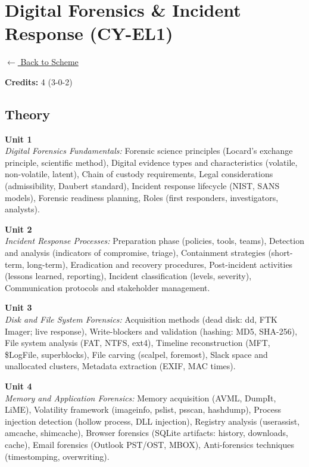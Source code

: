 \section*{Digital Forensics \& Incident Response (CY-EL1)}
\label{elec:CY_1}

\noindent \small{\hyperref[main:scheme]{$\leftarrow$ Back to Scheme}} \vspace{0.5cm}

\noindent \textbf{Credits:} 4 (3-0-2)

\subsection*{Theory}
\noindent\textbf{Unit 1} \\
\textit{Digital Forensics Fundamentals:} Forensic science principles (Locard's exchange principle, scientific method), Digital evidence types and characteristics (volatile, non-volatile, latent), Chain of custody requirements, Legal considerations (admissibility, Daubert standard), Incident response lifecycle (NIST, SANS models), Forensic readiness planning, Roles (first responders, investigators, analysts).

\vspace{0.3cm}

\noindent\textbf{Unit 2} \\
\textit{Incident Response Processes:} Preparation phase (policies, tools, teams), Detection and analysis (indicators of compromise, triage), Containment strategies (short-term, long-term), Eradication and recovery procedures, Post-incident activities (lessons learned, reporting), Incident classification (levels, severity), Communication protocols and stakeholder management.

\vspace{0.3cm}

\noindent\textbf{Unit 3} \\
\textit{Disk and File System Forensics:} Acquisition methods (dead disk: dd, FTK Imager; live response), Write-blockers and validation (hashing: MD5, SHA-256), File system analysis (FAT, NTFS, ext4), Timeline reconstruction (MFT, \$LogFile, superblocks), File carving (scalpel, foremost), Slack space and unallocated clusters, Metadata extraction (EXIF, MAC times).

\vspace{0.3cm}

\noindent\textbf{Unit 4} \\
\textit{Memory and Application Forensics:} Memory acquisition (AVML, DumpIt, LiME), Volatility framework (imageinfo, pslist, psscan, hashdump), Process injection detection (hollow process, DLL injection), Registry analysis (userassist, amcache, shimcache), Browser forensics (SQLite artifacts: history, downloads, cache), Email forensics (Outlook PST/OST, MBOX), Anti-forensics techniques (timestomping, overwriting).

